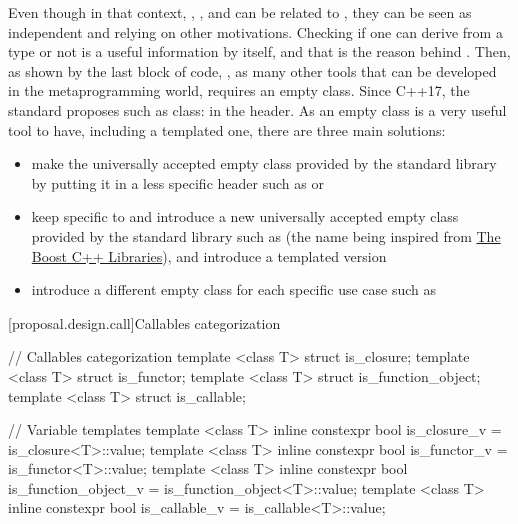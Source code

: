 \documentclass[ebook,10pt,oneside,openany,final]{memoir}
\begin{document}
Even though in that context, , , and  can be related to , they can be seen as independent and relying on other motivations. Checking if one can derive from a type or not is a useful information by itself, and that is the reason behind . Then, as shown by the last block of code, , as many other tools that can be developed in the metaprogramming world, requires an empty class. Since C++17, the standard proposes such as class:  in the  header. As an empty class is a very useful tool to have, including a templated one, there are three main solutions:
\begin{itemize}
\item make  the universally accepted empty class provided by the standard library by putting it in a less specific header such as  or 
\item keep  specific to  and introduce a new universally accepted empty class provided by the standard library such as  (the name being inspired from \href{https://www.boost.org/doc/libs/1_66_0/boost/blank.hpp}{The Boost C++ Libraries}), and introduce a templated version
\item introduce a different empty class for each specific use case such as 
\end{itemize} 
[proposal.design.call]{Callables categorization}

\begin{codeblock}
// Callables categorization
template <class T> struct is_closure;
template <class T> struct is_functor;
template <class T> struct is_function_object;
template <class T> struct is_callable;

// Variable templates
template <class T> inline constexpr bool is_closure_v = is_closure<T>::value;
template <class T> inline constexpr bool is_functor_v = is_functor<T>::value;
template <class T> inline constexpr bool is_function_object_v = is_function_object<T>::value;
template <class T> inline constexpr bool is_callable_v = is_callable<T>::value;
\end{codeblock}
\end{document}

